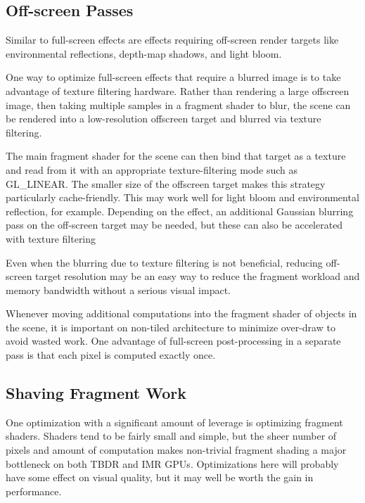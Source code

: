 \subsection{Off-screen Passes}\label{Jon-McCaffrey-Off-Screen-Pass}

 

Similar to full-screen effects are effects requiring off-screen render targets
like environmental reflections, depth-map shadows, and light bloom.

One way to optimize full-screen effects that require a blurred image is to take
advantage of texture filtering hardware.  Rather than rendering a large
offscreen image, then taking multiple samples in a fragment shader to blur, the
scene can be rendered into a low-resolution offscreen target and blurred via
texture filtering.

The main fragment shader for the scene can then bind that target as a texture
and read from it with an appropriate texture-filtering mode such as GL\_LINEAR.
The smaller size of the offscreen target makes this strategy particularly
cache-friendly.  This may work well for light bloom and environmental
reflection, for example.  Depending on the effect, an additional Gaussian
blurring pass on the off-screen target may be needed, but these can also be
accelerated with texture filtering \cite{bloom}

Even when the blurring due to texture filtering is not beneficial, reducing
off-screen target resolution may be an easy way to reduce the fragment workload
and memory bandwidth without a serious visual impact.

Whenever moving additional computations into the fragment shader of objects in
the scene, it is important on non-tiled architecture to minimize over-draw to
avoid wasted work.  One advantage of full-screen post-processing in a separate
pass is that each pixel is computed exactly once.

\subsection{Shaving Fragment Work}\label{Jon-McCaffrey-Shaving-Fragment-Work}

One optimization with a significant amount of leverage is optimizing fragment
shaders.  Shaders tend to be fairly small and simple, but the sheer number of
pixels and amount of computation makes non-trivial fragment shading a major
bottleneck on both TBDR and IMR GPUs.  Optimizations here will probably have
some effect on visual quality, but it may well be worth the gain in
performance.

